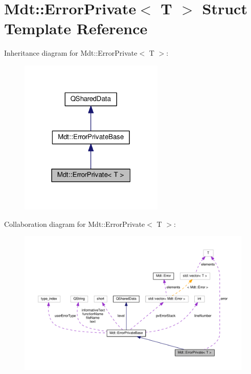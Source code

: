 \hypertarget{struct_mdt_1_1_error_private}{}\section{Mdt\+:\+:Error\+Private$<$ T $>$ Struct Template Reference}
\label{struct_mdt_1_1_error_private}


Inheritance diagram for Mdt\+:\+:Error\+Private$<$ T $>$\+:
\nopagebreak
\begin{figure}[H]
\begin{center}
\leavevmode
\includegraphics[width=195pt]{struct_mdt_1_1_error_private__inherit__graph}
\end{center}
\end{figure}


Collaboration diagram for Mdt\+:\+:Error\+Private$<$ T $>$\+:
\nopagebreak
\begin{figure}[H]
\begin{center}
\leavevmode
\includegraphics[width=350pt]{struct_mdt_1_1_error_private__coll__graph}
\end{center}
\end{figure}
